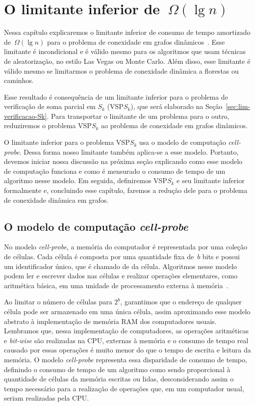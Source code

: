 \chapter{O limitante inferior de~$\Omega(\lg n)$}
\label{sec:lim}
Nessa capítulo explicaremos o limitante inferior de consumo de tempo amortizado de~$\Omega(\lg n)$ para o problema de conexidade em grafos dinâmicos~\cite{lowerBoundPatrascu}. Esse limitante é incondicional e é válido mesmo para os algoritmos que usam técnicas de aleatorização, no estilo Las Vegas ou Monte Carlo. Além disso, esse limitante é válido mesmo se limitarmos o problema de conexidade dinâmica a florestas ou caminhos. 

Esse resultado é consequência de um limitante inferior para o problema de verificação de soma parcial em $S_k$ (VSP$S_k$), 
que será elaborado na Seção~\ref{sec:lim-verificacao-Sk}. Para transportar o limitante de um problema para o outro, reduziremos o problema VSP$S_k$ ao problema de conexidade em grafos dinâmicos.

O limitante inferior para o problema VSP$S_k$ usa o modelo de computação \textit{cell-probe}. Dessa forma nosso limitante também aplica-se a esse modelo. Portanto, devemos iniciar nossa discussão na próxima seção explicando como esse modelo de computação funciona e como é mensurado o consumo de tempo de um algoritmo nesse modelo. Em seguida, definiremos VSP$S_k$ e seu limitante inferior formalmente e, concluindo esse capítulo, faremos a redução dele para o problema de conexidade dinâmica em grafos.

\section{O modelo de computação \textit{cell-probe}}
\label{sec:lim-cell-probe}
No modelo \textit{cell-probe}, a memória do computador é representada por uma coleção de células. Cada célula é composta por uma quantidade fixa de~$b$ bits e possui um identificador único, que é chamado de  da célula. Algoritmos nesse modelo podem ler e escrever dados nas células e realizar operações elementares, como aritmética básica, em uma unidade de processamento externa à memória~\cite{Ajtai1988}.

Ao limitar o número de células para $2^b$, garantimos que o endereço de qualquer célula pode ser armazenado em uma única célula, assim aproximando esse modelo abstrato à implementação de memória RAM dos computadores usuais. Lembramos que, nessa implementação de computadores, as operações aritméticas e \textit{bit-wise} são realizadas na CPU, externas à memória e o consumo de tempo real causado por essas operações é muito menor do que o tempo de escrita e leitura da memória. O modelo \textit{cell-probe} representa essa disparidade de consumo de tempo, definindo o consumo de tempo de um algoritmo como sendo proporcional à quantidade de células da memória escritas ou lidas, desconsiderando assim o tempo necessário para a realização de operações que, em um computador usual, seriam realizadas pela CPU.

